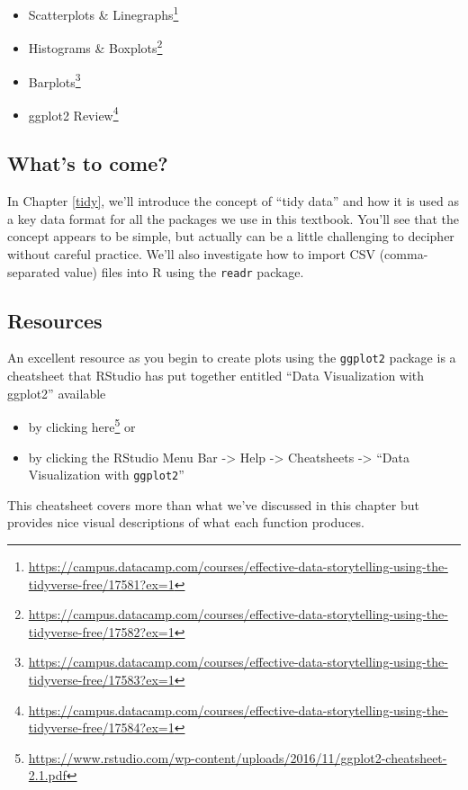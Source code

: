 \documentclass[12pt,]{krantz}
\providecommand{\tightlist}{%
  \setlength{\itemsep}{0pt}\setlength{\parskip}{0pt}}
\renewcommand{\href}[2]{#2\footnote{\url{#1}}}
\begin{document}
\begin{itemize}
\tightlist
\item
  \href{https://campus.datacamp.com/courses/effective-data-storytelling-using-the-tidyverse-free/17581?ex=1}{Scatterplots
  \& Linegraphs}
\item
  \href{https://campus.datacamp.com/courses/effective-data-storytelling-using-the-tidyverse-free/17582?ex=1}{Histograms
  \& Boxplots}
\item
  \href{https://campus.datacamp.com/courses/effective-data-storytelling-using-the-tidyverse-free/17583?ex=1}{Barplots}
\item
  \href{https://campus.datacamp.com/courses/effective-data-storytelling-using-the-tidyverse-free/17584?ex=1}{ggplot2
  Review}
\end{itemize}

\subsection{What's to come?}\label{whats-to-come-1}

In Chapter \ref{tidy}, we'll introduce the concept of ``tidy data'' and
how it is used as a key data format for all the packages we use in this
textbook. You'll see that the concept appears to be simple, but actually
can be a little challenging to decipher without careful practice. We'll
also investigate how to import CSV (comma-separated value) files into R
using the \texttt{readr} package.

\subsection{Resources}\label{resources}

An excellent resource as you begin to create plots using the
\texttt{ggplot2} package is a cheatsheet that RStudio has put together
entitled ``Data Visualization with ggplot2'' available

\begin{itemize}
\tightlist
\item
  by clicking
  \href{https://www.rstudio.com/wp-content/uploads/2016/11/ggplot2-cheatsheet-2.1.pdf}{here}
  or
\item
  by clicking the RStudio Menu Bar -\textgreater{} Help -\textgreater{}
  Cheatsheets -\textgreater{} ``Data Visualization with
  \texttt{ggplot2}''
\end{itemize}

This cheatsheet covers more than what we've discussed in this chapter
but provides nice visual descriptions of what each function produces.
\end{document}
